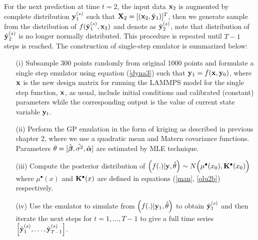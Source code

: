 For the next prediction at time $t=2$, the input data ${\bf x}_2$ is augmented by complete distribution ${\bf y}^{(s)}_1$ such that ${\bf X}_2=[({\bf x}_2,{\tilde {\bf y}}_1)]^T$,  then we generate sample from the distribution of $f({\tilde {\bf y}}^{(s)}_1,{\bf x}_2)$ and denote as ${\tilde {\bf y}}^{(s)}_2 $, note that distribution of ${\tilde {\bf y}}^{(s)}_2 $ is no longer normally distributed.
This procedure is repeated until $T-1$ steps is reached. The construction of single-step emulator is summarized below:
\begin{itemize}
 \item[{(i)}] Subsample 300 points randomly from original 1000 points and formulate a single step emulator using equation (\ref{dyna3}) such that ${\bf y}_1=f({\bf x},{\bf y}_0)$, where ${\bf x}$ is the new design matrix for running the LAMMPS model for the single step function, ${\bf x}$, as usual, include initial conditions and calibrated (constant) parameters while the corresponding output is the value of current state variable ${\bf y}_t$.

\item[{(ii)}] Perform the GP emulation in the form of kriging as described in previous chapter 2, where we use a quadratic mean and Matern covariance functions. Parameters $\theta=[{\hat{\boldsymbol{\beta}}}, \hat{\sigma^2},{\hat{\boldsymbol{\alpha}}}]$ are estimated by MLE technique.

\item[{(iii)}] Compute the posterior distribution of $\Big(f(.)|{\bf y},\hat\theta \Big)\sim N \Big(\mu^{\bullet}(x_0), {\mathbf{K}}^{\bullet}(x_0)\Big)$ where $\mu^{\bullet}(x)$ and ${\mathbf{K}}^{\bullet}(x)$ are defined in equations (\ref{man}, \ref{olu2b}) respectively.

\item[{(iv)}] Use the emulator to simulate from $\Big(f(.)|{\bf y}_1,\hat\theta\Big)$  to obtain ${\tilde {\bf y}}^{(s)}_{1}$ and then iterate the next steps for $t=1,\ldots,T-1$ to give a full time series $\Big[{\tilde {\bf y}}^{(s)}_1,\ldots,{\tilde {\bf y}}^{(s)}_{T-1}\Big]$. 


\end{itemize}
